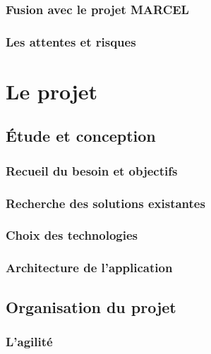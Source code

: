\documentclass[twoside, 12pt]{report}
\begin{document}
        \section{Fusion avec le projet MARCEL}
            

        \section{Les attentes et risques}
            

\part{Le projet}

    \chapter{Étude et conception}
    	
        
       	\section{Recueil du besoin et objectifs}
        	

        \section{Recherche des solutions existantes}
        	

        \section{Choix des technologies}
        	

        \section{Architecture de l'application}
        	

    \chapter{Organisation du projet}
    	

        \section{L'agilité}
    		
\end{document}

